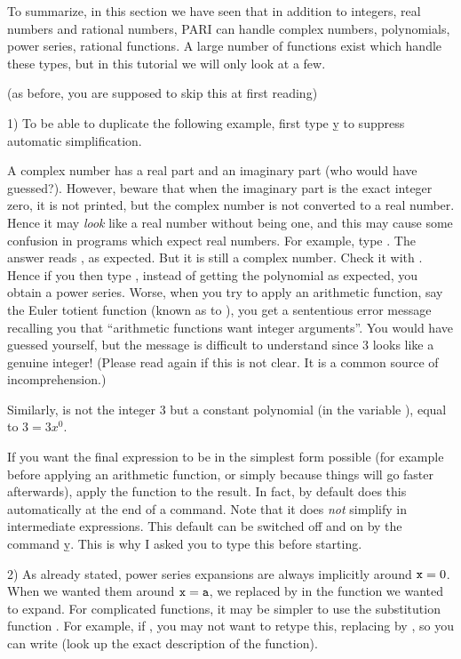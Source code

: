 To summarize, in this section we have seen that in addition to integers, real
numbers and rational numbers, PARI can handle complex numbers, polynomials,
power series, rational functions. A large number of functions exist which
handle these types, but in this tutorial we will only look at a few.

 (as before, you are supposed to skip this
at first reading)

1) To be able to duplicate the following example, first type \b{y} to
suppress automatic simplification.

A complex number has a real part and an imaginary part (who would have
guessed?). However, beware that when the imaginary part is the exact integer
zero, it is not printed, but the complex number is not converted to a real
number. Hence it may {\it look\/} like a real number without being one, and
this may cause some confusion in programs which expect real numbers. For
example, type . The answer reads , as expected. But
it is still a complex number. Check it with . Hence if you then
type , instead of getting the polynomial
 as expected, you obtain a power series.
Worse, when you try to apply an arithmetic function, say the Euler totient
function (known as  to ), you get a sententious error message
recalling you that ``arithmetic functions want integer arguments''. You would
have guessed yourself, but the message is difficult to understand since 3 looks
like a genuine integer! (Please read again if this is not clear. It is a
common source of incomprehension.)

Similarly,  is not the integer 3 but a constant polynomial
(in the variable ), equal to $3 = 3x^0$.

If you want the final expression to be in the simplest form possible (for
example before applying an arithmetic function, or simply because things will
go faster afterwards), apply the function  to the result. In
fact, by default  does this automatically at the end of a  command. Note
that it does {\it not\/} simplify in intermediate expressions. This default
can be switched off and on by the command \b{y}. This is why I asked you to
type this before starting.

2) As already stated, power series expansions are always implicitly around
${\tt x} = 0$. When we wanted them around ${\tt x} = {\tt a}$, we replaced
 by  in the function we wanted to expand. For complicated
functions, it may be simpler to use the substitution function .
For example, if ,
you may not want to retype this, replacing  by , so you can
write  (look up the exact description of the
 function).

